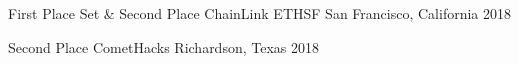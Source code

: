 



\begin{cvhonors}

  \cvhonor
    {First Place Set \& Second Place ChainLink} %
    {ETHSF} %
    {San Francisco, California} %
    {2018} %

\end{cvhonors}




\begin{cvhonors}

  \cvhonor
    {Second Place} %
    {CometHacks} %
    {Richardson, Texas} %
    {2018} %

\end{cvhonors}
